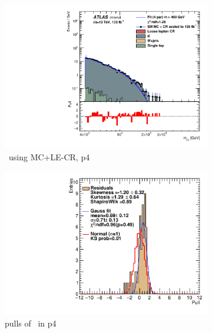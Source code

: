 \newpage

\begin{figure}[ht]
    \centering
    \begin{subfigure}[h]{0.38\linewidth}
    \includegraphics[scale=0.3]{figs/ch6/fit/variable_nosmooth/p4/01PB/output_SMMCplusCR_Mjm_p4.pdf}%
    \caption{\mjmu \ using MC+LE-CR, p4}
    \end{subfigure}
    \hfill
    \begin{subfigure}[h]{0.4\linewidth}
    \includegraphics[scale=0.32]{figs/ch6/fit/variable_nosmooth/p4/01PB/pull_SMMCplusCR_Mjm_p4.pdf}%
    \caption{pulls of \mjmu \ in p4}
    \end{subfigure}
    \hfill
    \begin{subfigure}[h]{0.38\linewidth}

\end{subfigure}
\end{figure}
